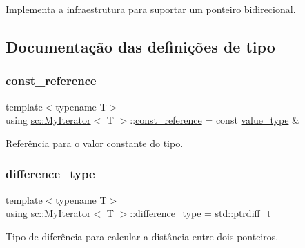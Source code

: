 Implementa a infraestrutura para suportar um ponteiro bidirecional. 

\subsection{Documentação das definições de tipo}
\mbox{\label{classsc_1_1MyIterator_ad8f5e1835e5247b500a08297a4f79a3c}} 
\subsubsection{\texorpdfstring{const\+\_\+reference}{const\_reference}}
{\footnotesize\ttfamily template$<$typename T$>$ \\
using \hyperlink{classsc_1_1MyIterator}{sc\+::\+My\+Iterator}$<$ T $>$\+::\hyperlink{classsc_1_1MyIterator_ad8f5e1835e5247b500a08297a4f79a3c}{const\+\_\+reference} =  const \hyperlink{classsc_1_1MyIterator_a87259a3ccf8ff488d496b658324c4b2d}{value\+\_\+type} \&}



Referência para o valor constante do tipo. 

\mbox{\label{classsc_1_1MyIterator_ab37e30d9d7abaca8b7ed9c4ba7371798}} 
\subsubsection{\texorpdfstring{difference\+\_\+type}{difference\_type}}
{\footnotesize\ttfamily template$<$typename T$>$ \\
using \hyperlink{classsc_1_1MyIterator}{sc\+::\+My\+Iterator}$<$ T $>$\+::\hyperlink{classsc_1_1MyIterator_ab37e30d9d7abaca8b7ed9c4ba7371798}{difference\+\_\+type} =  std\+::ptrdiff\+\_\+t}



Tipo de diferência para calcular a distância entre dois ponteiros. 

\mbox{\label{classsc_1_1MyIterator_aac55734d4d00af05ed90556dd8f8df0b}} 
